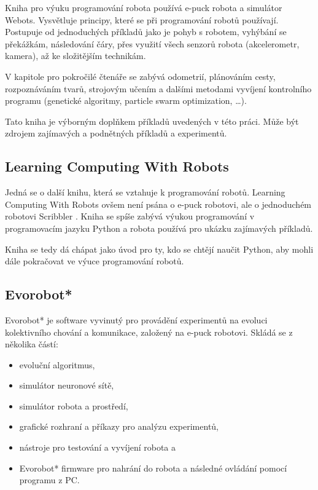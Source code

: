         Kniha pro výuku programování robota používá e-puck robota a simulátor
        Webots. Vysvětluje principy, které se při programování robotů
        používají. Postupuje od jednoduchých příkladů jako je pohyb s robotem,
        vyhýbání se překážkám, následování čáry, přes využití všech senzorů
        robota (akcelerometr, kamera), až ke složitějším technikám.

        V kapitole pro pokročilé čtenáře se zabývá odometrií, plánováním cesty,
        rozpoznáváním tvarů, strojovým učením a dalšími metodami vyvíjení
        kontrolního programu (genetické algoritmy, particle swarm optimization,
        \ldots).

        Tato kniha je výborným doplňkem příkladů uvedených v této práci. Může
        být zdrojem zajímavých a podnětných příkladů a experimentů.

        \subsection{Learning Computing With Robots}
        \label{learning-computing}

        Jedná se o další knihu, která se vztahuje k programování robotů.
        Learning Computing With Robots \cite{learning} ovšem není psána o e-puck
        robotovi, ale o jednoduchém robotovi Scribbler \cite{scribbler}. Kniha se spíše zabývá
        výukou programování v programovacím jazyku Python a robota používá pro
        ukázku zajímavých příkladů.

        Kniha se tedy dá chápat jako úvod pro ty, kdo se chtějí naučit Python,
        aby mohli dále pokračovat ve výuce programování robotů.

        \subsection{Evorobot*}
        \label{evorobot*}

        Evorobot* \cite{evorobot} je software vyvinutý pro provádění
        experimentů na evoluci kolektivního chování a komunikace, založený na
        e-puck robotovi. Skládá se z několika částí:

        \begin{itemize}
            \item evoluční algoritmus,
            \item simulátor neuronové sítě,
            \item simulátor robota a prostředí,
            \item grafické rozhraní a příkazy pro analýzu experimentů,
            \item nástroje pro testování a vyvíjení robota a
            \item Evorobot* firmware pro nahrání do robota a následné ovládání pomocí programu z PC.
        \end{itemize}

